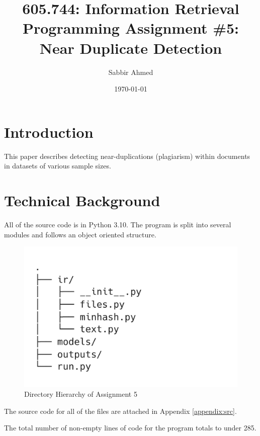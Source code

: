 \documentclass[11pt]{article}
\title{605.744: Information Retrieval \\ Programming Assignment \#5: Near Duplicate Detection}
\author{Sabbir Ahmed}
\date{\today}
\begin{document}
\maketitle
\tableofcontents
\clearpage
\newpage

\section{Introduction}
This paper describes detecting near-duplications (plagiarism) within documents in datasets of various sample sizes.

\section{Technical Background}
All of the source code is in Python 3.10. The program is split into several modules and follows an object oriented structure.


\begin{figure}[!ht]
  \centering
  \includegraphics[trim={0 3cm 15cm 3cm},clip,scale=0.3]{statics/dirtree.png}
  \caption{Directory Hierarchy of Assignment 5}
\end{figure}

The source code for all of the files are attached in Appendix \ref{appendix:src}.

The total number of non-empty lines of code for the program totals to under 285.
\end{document}
